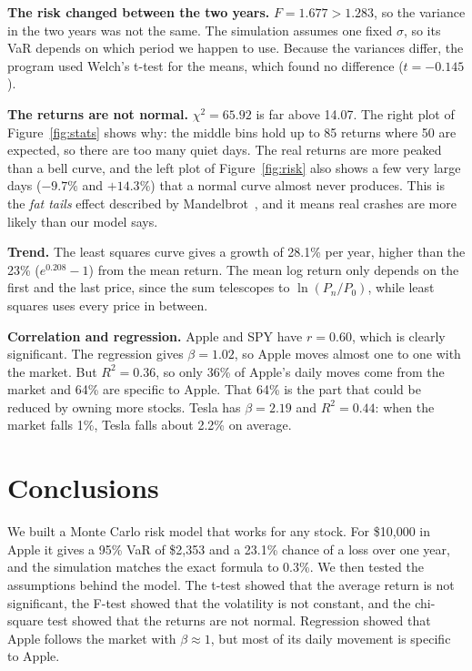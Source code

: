 \documentclass[10pt,a4paper,openany,oneside]{book}
\begin{document}
\textbf{The risk changed between the two years.} $F = 1.677 > 1.283$, so the variance in the two
years was not the same. The simulation assumes one fixed $\sigma$, so its VaR depends on which
period we happen to use. Because the variances differ, the program used Welch's t-test for the
means, which found no difference ($t=-0.145$).

\textbf{The returns are not normal.} $\chi^2 = 65.92$ is far above 14.07. The right plot of
Figure~\ref{fig:stats} shows why: the middle bins hold up to 85 returns where 50 are expected, so
there are too many quiet days. The real returns are more peaked than a bell curve, and
the left plot of Figure~\ref{fig:risk} also shows a few very large days ($-9.7\%$ and $+14.3\%$)
that a normal curve almost never produces. This is the \emph{fat tails} effect described by
Mandelbrot~\cite{mandelbrot}, and it means real crashes are more likely than our model says.

\textbf{Trend.} The least squares curve gives a growth of 28.1\% per year, higher than the 23\%
($e^{0.208}-1$) from the mean return. The mean log return only depends on the first and the last
price, since the sum telescopes to $\ln(P_n/P_0)$, while least squares uses every price in between.

\textbf{Correlation and regression.} Apple and SPY have $r = 0.60$, which is clearly significant.
The regression gives $\beta = 1.02$, so Apple moves almost one to one with the market. But
$R^2 = 0.36$, so only 36\% of Apple's daily moves come from the market and 64\% are specific to
Apple. That 64\% is the part that could be reduced by owning more stocks. Tesla has
$\beta = 2.19$ and $R^2 = 0.44$: when the market falls 1\%, Tesla falls about 2.2\% on average.

\chapter{Conclusions}

We built a Monte Carlo risk model that works for any stock. For \$10{,}000 in Apple it gives a
95\% VaR of \$2{,}353 and a 23.1\% chance of a loss over one year, and the simulation matches the
exact formula to 0.3\%. We then tested the assumptions behind the model. The t-test showed that
the average return is not significant, the F-test showed that the volatility is not constant, and
the chi-square test showed that the returns are not normal. Regression showed that Apple follows
the market with $\beta \approx 1$, but most of its daily movement is specific to Apple.
\end{document}
